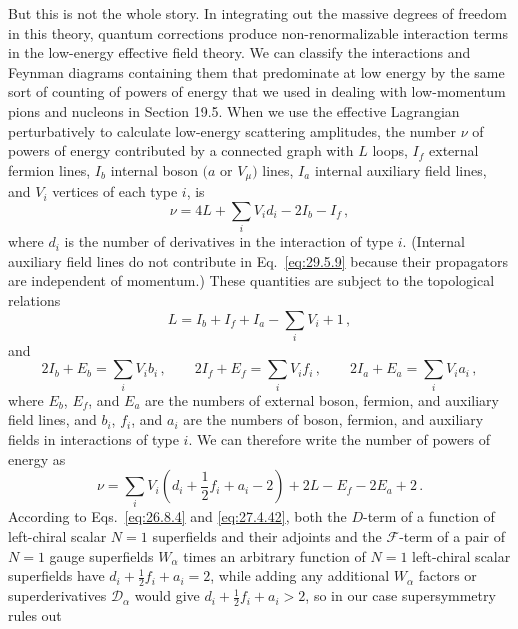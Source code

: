 But this is not the whole story. In integrating out the massive degrees of
freedom in this theory, quantum corrections produce non-renormalizable
interaction terms in the low-energy effective field theory. We can classify
the interactions and Feynman diagrams containing them that predominate at
low energy by the same sort of counting of powers of energy that we used in
dealing with low-momentum pions and nucleons in Section 19.5. When we use the
effective Lagrangian perturbatively to calculate low-energy scattering
amplitudes, the number \(\nu\) of powers of energy contributed by a connected
graph with \(L\) loops, \(I_f\) external fermion lines, \(I_b\) internal boson
\((a\) or \(V_\mu)\) lines, \(I_a\) internal auxiliary field lines, and
\(V_i\) vertices of each type \(i\), is
\begin{equation}
  \nu=4L+\sum_iV_id_i-2I_b-I_f\,,
  \tag{29.5.9}\label{eq:29.5.9}
\end{equation}
where \(d_i\) is the number of derivatives in the interaction of type \(i\).
(Internal auxiliary field lines do not contribute in Eq.~\eqref{eq:29.5.9}
because their propagators are independent of momentum.) These quantities
are subject to the topological relations
\begin{equation}
  L=I_b+I_f+I_a-\sum_iV_i+1\,,
  \tag{29.5.10}\label{eq:29.5.10}
\end{equation}
and
\begin{equation}
  2I_b+E_b=\sum_iV_ib_i\,,
  \qquad
  2I_f+E_f=\sum_iV_if_i\,,
  \qquad
  2I_a+E_a=\sum_iV_ia_i\,,
  \tag{29.5.11}\label{eq:29.5.11}
\end{equation}
where \(E_b\), \(E_f\), and \(E_a\) are the numbers of external boson,
fermion, and auxiliary field lines, and \(b_i\), \(f_i\), and \(a_i\) are the
numbers of boson, fermion, and auxiliary fields in interactions of type
\(i\). We can therefore write the number of powers of energy as
\begin{equation}
  \nu=\sum_iV_i\left(d_i+\frac12f_i+a_i-2\right)
  +2L-E_f-2E_a+2\,.
  \tag{29.5.12}\label{eq:29.5.12}
\end{equation}
According to Eqs.~\eqref{eq:26.8.4} and \eqref{eq:27.4.42}, both the
\(D\)-term of a function of left-chiral scalar \(N=1\) superfields and
their adjoints and the \(\mathcal{F}\)-term of a pair of \(N=1\) gauge
superfields \(W_\alpha\) times an arbitrary function of \(N=1\) left-chiral
scalar superfields have \(d_i+\tfrac12f_i+a_i=2\), while adding any
additional \(W_\alpha\) factors or superderivatives \(\mathcal{D}_\alpha\)
would give \(d_i+\tfrac12f_i+a_i>2\), so in our case supersymmetry rules out
